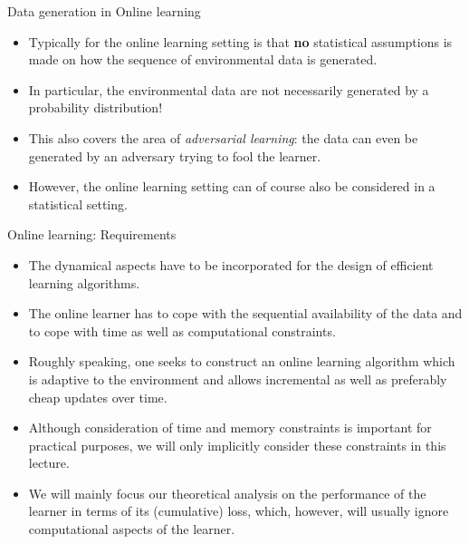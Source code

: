 \begin{frame}{Data generation in Online learning}
%	
	\begin{itemize}
%		
		\item Typically for the online learning setting is that \textbf{no} statistical assumptions is made on how the sequence of environmental data is generated.
%		
		\item In particular, the environmental data are not necessarily generated by a probability distribution!
%		
		\item This also covers the area of \emph{adversarial learning}: the data can even be generated by an adversary trying to fool the learner.
%		
		\item However, the online learning setting can of course also be considered in a statistical setting.
%		
	\end{itemize}
%	
\end{frame}


\begin{frame}{Online learning: Requirements}
	\small
	\begin{itemize}
		\item The dynamical aspects have to be incorporated for the design of efficient learning algorithms. 
		 \item The online learner has to cope with the sequential availability of the data and to cope with time as well as computational constraints.
		 \item Roughly speaking, one seeks to construct an online learning algorithm which is adaptive to the environment and allows incremental as well as preferably cheap updates over time.
		 \item Although consideration of time and memory constraints is important for practical purposes, we will only implicitly consider these constraints in this lecture. 
		 \item We will mainly focus our theoretical analysis on the performance of the learner in terms of its (cumulative) loss, which, however, will usually ignore computational aspects of the learner.
	\end{itemize}
\end{frame}


